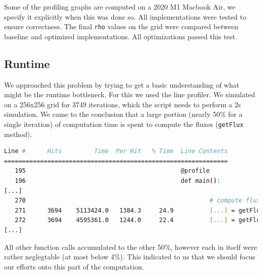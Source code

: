 \documentclass[a4paper,10pt]{article}
\begin{document}
Some of the profiling graphs are computed on a 2020 M1 Macbook Air, we specify it explicitly when this was done so.
All implementations were tested to ensure correctness.
The final \verb|rho| values on the grid were compared between baseline and optimized implementations.
All optimizations passed this test.

\subsection{Runtime}
We approached this problem by trying to get a basic understanding of what might be the runtime bottleneck.
For this we used the line profiler.
We simulated on a 256x256 grid for 3749 iterations, which the script needs to perform a 2s simulation.
We came to the conclusion that a large portion (nearly 50\% for a single iteration) of computation time is spent to compute the fluxes (\verb|getFlux| method).
\begin{lstlisting}[language=bash,basicstyle=\scriptsize\ttfamily]
Line #      Hits         Time  Per Hit   % Time  Line Contents
==============================================================
   195                                           @profile
   196                                           def main():
[...]
   270                                                   # compute fluxes
   271      3694    5113424.0   1384.3     24.9          [...] = getFlux(...)
   272      3694    4595361.0   1244.0     22.4          [...] = getFlux(...)
[...]
\end{lstlisting}
All other function calls accumulated to the other 50\%, however each in itself were rather neglegtable (at most below 4\%).
This indicated to us that we should focus our efforts onto this part of the computation.
\end{document}
